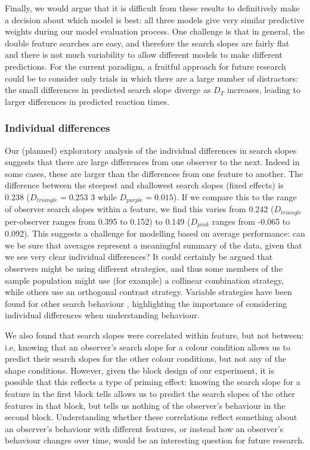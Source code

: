 \documentclass[preprint,12pt,authoryear]{elsarticle}
\begin{document}
Finally, we would argue that it is difficult from these results to definitively make a decision about which model is best: all three models give very similar predictive weights during our model evaluation process. One challenge is that in general, the double feature searches are easy, and therefore the search slopes are fairly flat and there is not much variability to allow different models to make different predictions. For the current paradigm, a fruitful approach for future research could be to consider only trials in which there are a large number of distractors: the small differences in predicted search slope diverge as $D_T$ increases, leading to larger  differences in predicted reaction times.

\subsubsection{Individual differences}

Our (planned) exploratory analysis of the individual differences in search slopes suggests that there are large differences from one observer to the next. Indeed in some cases, these are larger than the differences from one feature to another. The difference between the steepest and shallowest search slopes (fixed effects) is 0.238 ($D_{triangle} = 0.253$ 3 while $D_{purple} = 0.015$). If we compare this to the range of observer search slopes within a feature, we find this varies from 0.242 ($D_{triangle}$ per-observer ranges from 0.395 to 0.152) to 0.149 ($D_{pink}$ ranges from -0.065 to 0.092). This suggests a challenge for modelling based on average performance: can we be sure that averages represent a meaningful summary of the data, given that we see very clear individual differences? It could certainly be argued that observers might be using different strategies, and thus some members of the sample population might use (for example) a collinear combination strategy, while others use an orthogonal contrast strategy. Variable strategies have been found for other search behaviour \citep{clarke2022stable, kristjansson2014common, proulx2011individual, li2022assessing}, highlighting the importance of considering individual differences when understanding behaviour.

We also found that search slopes were correlated within feature, but not between:  i.e, knowing that an observer's search slope for a colour condition allows us to predict their search slopes for the other colour conditions, but not any of the shape conditions. However, given the block design of our experiment, it is possible that this reflects a type of priming effect: knowing the search slope for a feature in the first block tells allows us to predict the search slopes of the other features in that block, but tells us nothing of the observer's behaviour in the second block. Understanding whether these correlations reflect something about an observer's behaviour with different features, or instead how an observer's behaviour changes over time, would be an interesting question for future research.
\end{document}
